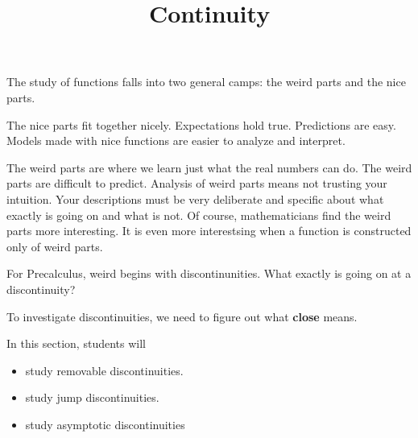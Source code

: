 \documentclass{ximera}
\title{Continuity}
\begin{document}
\begin{abstract}
\end{abstract}
\maketitle






The study of functions falls into two general camps: the weird parts and the nice parts.  

The nice parts fit together nicely. Expectations hold true. Predictions are easy. Models made with nice functions are easier to analyze and interpret.


The weird parts are where we learn just what the real numbers can do.  The weird parts are difficult to predict. Analysis of weird parts means not trusting your intuition.  Your descriptions must be very deliberate and specific about what exactly is going on and what is not.  Of course, mathematicians find the weird parts more interesting.  It is even more interestsing when a function is constructed only of weird parts.


For Precalculus, weird begins with discontinunities.  What exactly is going on at a discontinuity?


To investigate discontinuities, we need to figure out what \textbf{close} means.
































\begin{sectionOutcomes}
In this section, students will 

\begin{itemize}
\item study removable discontinuities.
\item study jump discontinuities.
\item study asymptotic discontinuities

\end{itemize}
\end{sectionOutcomes}
\end{document}
